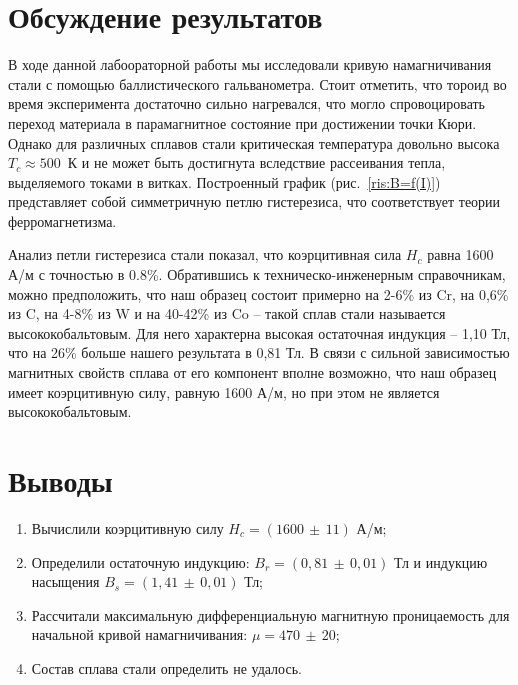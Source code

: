 \documentclass[a4paper,12pt]{article} %
\begin{document}
\section {Обсуждение результатов}
	В ходе данной лабоораторной работы мы исследовали кривую намагничивания стали с помощью баллистического гальванометра. Стоит отметить, что тороид во время эксперимента достаточно сильно нагревался, что могло спровоцировать переход материала в парамагнитное состояние при достижении точки Кюри. Однако для различных сплавов стали критическая температура довольно высока $T_c \approx 500$~К и не может быть достигнута вследствие рассеивания тепла, выделяемого токами в витках. Построенный график (рис.~\ref{ris:B=f(I)}) представляет собой симметричную петлю гистерезиса, что соответствует теории ферромагнетизма.
	
	Анализ петли гистерезиса стали показал, что коэрцитивная сила $H_c$ равна 1600 А/м с точностью в 0.8\%. Обратившись к техническо-инженерным справочникам, можно предположить, что наш образец состоит примерно на 2-6\% из Cr, на 0,6\% из C, на 4-8\% из W и на 40-42\% из Co -- такой сплав стали называется высококобальтовым. Для него характерна высокая остаточная индукция -- 1,10 Тл, что на 26\% больше нашего результата в 0,81 Тл. В связи с сильной зависимостью магнитных свойств сплава от его компонент вполне возможно, что наш образец имеет коэрцитивную силу, равную 1600 А/м, но при этом не является высококобальтовым.
	
	
\section{Выводы}
	\begin{enumerate}
		\item 
			Вычислили коэрцитивную силу $H_c = (1600\,\pm\, 11)$ А/м;
		\item 
			Определили остаточную индукцию: $B_r =(0,81\,\pm\,0,01)$ Тл и индукцию насыщения $B_s = (1,41\,\pm\, 0,01)$ Тл;
		\item
			Рассчитали максимальную дифференциальную магнитную проницаемость для начальной кривой намагничивания: $\mu = 470 \, \pm \, 20$;
		\item 	
			Состав сплава стали определить не удалось.
	\end{enumerate}
\end{document}
